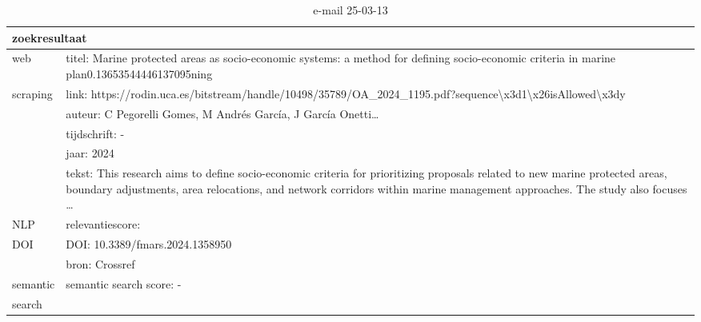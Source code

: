 \begin{table}[h!]
    \caption{e-mail 25-03-13}
    \centering
    \begin{tabularx}{\textwidth}{|p{4cm}|X|} 
        \hline
        \multicolumn{2}{|X|}{\textbf{zoekresultaat}} \\
        \hline
        web &titel: Marine protected areas as socio-economic systems: a method for defining socio-economic criteria in marine plan0.13653544446137095ning\\
        scraping&link: https://rodin.uca.es/bitstream/handle/10498/35789/OA_2024_1195.pdf?sequence\textbackslash x3d1\textbackslash x26isAllowed\textbackslash x3dy\\
        &auteur: C Pegorelli Gomes, M Andrés García, J García Onetti…\\
        &tijdschrift: -\\
        &jaar: 2024\\
        &tekst: This research aims to define socio-economic criteria for prioritizing proposals related to new marine protected areas, boundary adjustments, area relocations, and network corridors within marine management approaches. The study also focuses …\\
        \hline
        NLP&relevantiescore: \\
        \hline
        DOI&DOI: 10.3389/fmars.2024.1358950\\
        &bron: Crossref\\
        \hline
        semantic&semantic search score: -\\
        search&\\
        \hline
    \end{tabularx}
    \label{table:email20250313}
\end{table}
